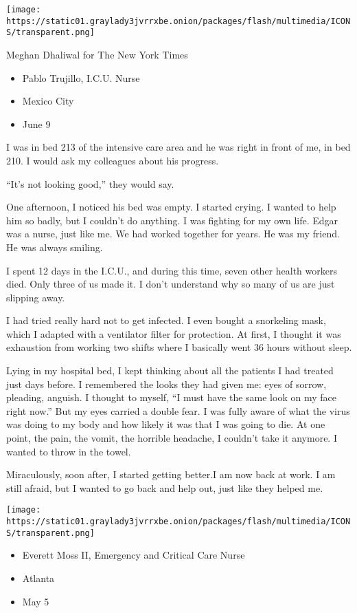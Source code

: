 \texttt{[image: https://static01.graylady3jvrrxbe.onion/packages/flash/multimedia/ICONS/transparent.png]}

Meghan Dhaliwal for The New York Times

\begin{itemize}
\tightlist
\item
  Pablo Trujillo, I.C.U. Nurse
\item
  Mexico City
\item
  June 9
\end{itemize}

I was in bed 213 of the intensive care area and he was right in front of
me, in bed 210. I would ask my colleagues about his progress.

``It's not looking good,'' they would say.

One afternoon, I noticed his bed was empty. I started crying. I wanted
to help him so badly, but I couldn't do anything. I was fighting for my
own life. Edgar was a nurse, just like me. We had worked together for
years. He was my friend. He was always smiling.

I spent 12 days in the I.C.U., and during this time, seven other health
workers died. Only three of us made it. I don't understand why so many
of us are just slipping away.

I had tried really hard not to get infected. I even bought a snorkeling
mask, which I adapted with a ventilator filter for protection. At first,
I thought it was exhaustion from working two shifts where I basically
went 36 hours without sleep.

Lying in my hospital bed, I kept thinking about all the patients I had
treated just days before. I remembered the looks they had given me: eyes
of sorrow, pleading, anguish. I thought to myself, ``I must have the
same look on my face right now.'' But my eyes carried a double fear. I
was fully aware of what the virus was doing to my body and how likely it
was that I was going to die. At one point, the pain, the vomit, the
horrible headache, I couldn't take it anymore. I wanted to throw in the
towel.

Miraculously, soon after, I started getting better.I am now back at
work. I am still afraid, but I wanted to go back and help out, just like
they helped me.

\texttt{[image: https://static01.graylady3jvrrxbe.onion/packages/flash/multimedia/ICONS/transparent.png]}

\begin{itemize}
\tightlist
\item
  Everett Moss II, Emergency and Critical Care Nurse
\item
  Atlanta
\item
  May 5
\end{itemize}

